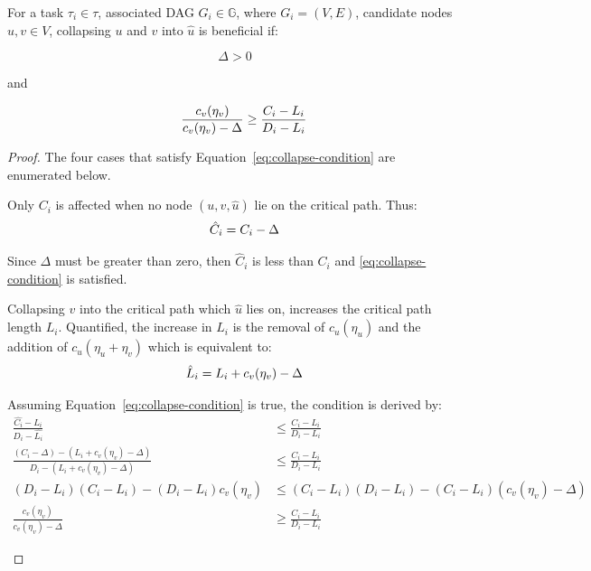 \begin{theorem}\label{thm:relaxed-collapse}
  For a task ${\tau_i \in \tau}$, associated DAG ${G_i \in \mathbb{G}}$,
  where ${G_i = (V, E)}$, candidate nodes ${u,v \in V}$,
  collapsing ${u}$ and ${v}$ into ${\hat{u}}$ is beneficial if:

  \begin{equation}
    \Delta > 0
  \end{equation}

  and
  
  \begin{equation}
    \indent
    \frac{c_v(\eta_v)}{c_v(\eta_v) - \Delta} \ge
    \frac{C_i - L_i}{D_i - L_i}
  \end{equation}

  \begin{proof}
    The four cases that satisfy Equation~\ref{eq:collapse-condition}
    are enumerated below.

    \setcounter{case}{0}
    \begin{case}
      Only ${C_i}$ is affected when no node ${(u,v,\hat{u})}$ lie on
      the critical path. Thus:
      \begin{align}
        \indent
        \hat{C}_i = C_i - \Delta
      \end{align}

      Since ${\Delta}$ must be greater than zero, then ${\hat{C}_i}$ is
      less than ${C_i}$ and \ref{eq:collapse-condition} is satisfied.
    \end{case}

    \begin{case}
      Collapsing ${v}$ into the critical path which ${\hat{u}}$ lies
      on, increases the critical path length ${L_i}$. Quantified, the
      increase in ${L_i}$ is the removal of ${c_u(\eta_u)}$ and the
      addition of ${c_u(\eta_u + \eta_v)}$ which is equivalent to:
      \begin{align}
        \indent
        \hat{L}_i = L_i + c_v(\eta_v) - \Delta
      \end{align}

      Assuming Equation~\ref{eq:collapse-condition} is true, the
      condition is derived by:
      \begin{align*}
        \frac{\hat{C_i} - \hat{L_i}} 
             {D_i - \hat{L_i}} &\le
        \frac{C_i - L_i}
             {D_i - L_i} \\
        \frac{(C_i - \Delta) - (L_i + c_v(\eta_v) - \Delta)}
             {D_i - (L_i + c_v(\eta_v) - \Delta)} & \le
        \frac{C_i - L_i}
             {D_i - L_i} \\
        (D_i - L_i)(C_i - L_i) - (D_i - L_i)c_v(\eta_v) & \le
             (C_i - L_i)(D_i - L_i) - (C_i - L_i)(c_v(\eta_v) - \Delta) \\
        \frac{c_v(\eta_v)}{c_v(\eta_v) - \Delta} & \ge
        \frac{C_i - L_i}{D_i - L_i}
      \end{align*}
    \end{case}


\end{proof}
\end{theorem}
